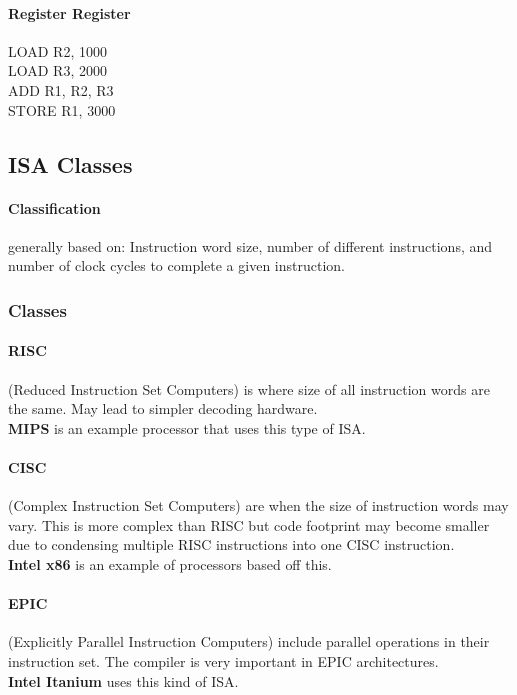 \documentclass{article}
\newcommand\tab[1][0.5cm]{\hspace*{#1}}
\begin{document}
			\paragraph{\tab Register Register\\}
					LOAD R2, 1000 \\ \tab
					LOAD R3, 2000 \\ \tab
					ADD R1, R2, R3 \\ \tab
					STORE R1, 3000


	\subsection{ISA Classes}
		\paragraph{Classification} generally based on: Instruction word size, number of different instructions, and number of clock cycles to complete a given instruction.

		\subsubsection{Classes}
			\paragraph{RISC} (Reduced Instruction Set Computers) is where size of all instruction words are the same. May lead to simpler decoding hardware. 
			\\ \tab \textbf{MIPS} is an example processor that uses this type of ISA.

			\paragraph{CISC} (Complex Instruction Set Computers) are when the size of instruction words may vary. This is more complex than RISC but code footprint may become smaller due to condensing multiple RISC instructions into one CISC instruction. 
			\\ \tab \textbf{Intel x86} is an example of processors based off this.

			\paragraph{EPIC} (Explicitly Parallel Instruction Computers) include parallel operations in their instruction set. The compiler is very important in EPIC architectures.
			\\ \tab \textbf{Intel Itanium} uses this kind of ISA.
\end{document}

